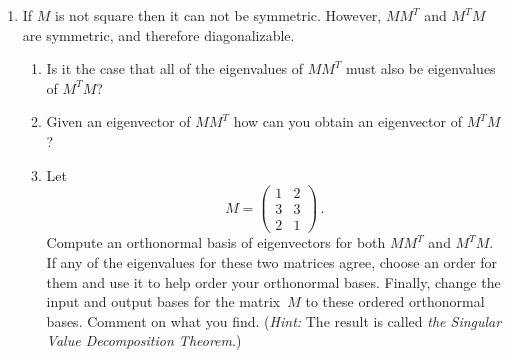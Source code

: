\begin{enumerate}
\item If $M$ is not square then it can not be symmetric. However, $MM^T$ and $M^TM$ are symmetric, and therefore diagonalizable. 
\begin{enumerate}
\item Is it the case that all of the eigenvalues of $MM^T$ must also be eigenvalues of $M^TM$? 
\item Given an eigenvector of $MM^T$ how can you obtain an eigenvector of $M^TM$?
\item Let \[M=\begin{pmatrix}1&2\\3&3\\2&1\end{pmatrix}\, .\]
Compute an orthonormal basis of eigenvectors for both $MM^T$ and $M^TM$. If any of the eigenvalues for these two matrices agree,
choose an order for them and use it to help order your orthonormal bases. Finally, change the input and output bases
for the matrix~$M$ to these ordered orthonormal bases. Comment on what you find. ({\itshape Hint:} 
The result is called \emph{the Singular Value Decomposition Theorem}.) 
\end{enumerate}












\end{enumerate}

